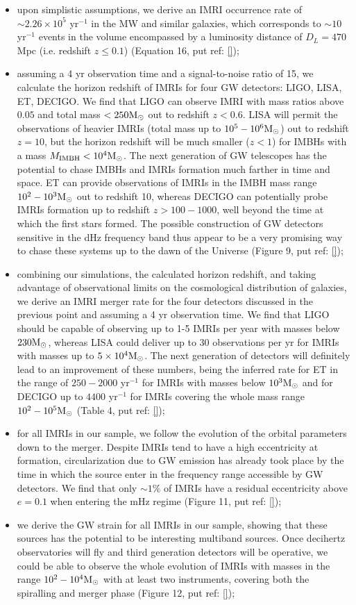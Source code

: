 \documentclass[twocolumn]{aastex62}
\newcommand{\Ms}{{\rm M}_\odot}
\newcommand{\ibh}{{\rm IMBH}}
\begin{document}
\begin{itemize}
\item upon simplistic assumptions, we derive an IMRI occurrence rate of $\sim 2.26\times 10^5$ yr$^{-1}$ in the MW and similar galaxies, which corresponds to $\sim 10$ yr$^{-1}$ events in the volume encompassed by a luminosity distance of $D_L = 470$ Mpc (i.e. redshift $z\leq 0.1$) (Equation 16, put ref: \ref{});
\item assuming a 4 yr observation time and a signal-to-noise ratio of 15, we calculate the horizon redshift of IMRIs for four GW detectors: LIGO, LISA, ET, DECIGO. We find that LIGO can observe IMRI with mass ratios above $0.05$ and total mass $<250\Ms$ out to redshift $z<0.6$. LISA will permit the observations of heavier IMRIs (total mass up to $10^5-10^6\Ms$) out to redshift $z=10$, but the horizon redshift will be much smaller ($z < 1$) for IMBHs with a mass $M_\ibh<10^4\Ms$. The next generation of GW telescopes has the potential to chase IMBHs and IMRIs formation much farther in time and space. ET can provide observations of IMRIs in the IMBH mass range $10^2-10^3\Ms$ out to redshift 10, whereas DECIGO can potentially probe IMRIs formation up to redshift $z > 100-1000$, well beyond the time at which the first stars formed. The possible construction of GW detectors sensitive in the dHz frequency band thus appear to be a very promising way to chase these systems up to the dawn of the Universe (Figure 9, put ref: \ref{});
\item combining our simulations, the calculated horizon redshift, and taking advantage of observational limits on the cosmological distribution of galaxies, we derive an IMRI merger rate for the four detectors discussed in the previous point and assuming a 4 yr observation time. We find that LIGO should be capable of observing up to 1-5 IMRIs per year with masses below $230\Ms$, whereas LISA could deliver up to 30 observations per yr for IMRIs with masses up to $5\times 10^4\Ms$. The next generation of detectors will definitely lead to an improvement of these numbers, being the inferred rate for ET in the range of $250-2000$ yr$^{-1}$ for IMRIs with masses below $10^3\Ms$ and for DECIGO up to $4400$ yr$^{-1}$ for IMRIs covering the whole mass range $10^2-10^5\Ms$ (Table 4, put ref: \ref{});
\item for all IMRIs in our sample, we follow the evolution of the orbital parameters down to the merger. Despite IMRIs tend to have a high eccentricity at formation, circularization due to GW emission has already took place by the time in which the source enter in the frequency range accessible by GW detectors. We find that only $\sim 1\%$ of IMRIs have a residual eccentricity above $e = 0.1$ when entering the mHz regime (Figure 11, put ref: \ref{});
\item we derive the GW strain for all IMRIs in our sample, showing that these sources has the potential to be interesting multiband sources. Once decihertz observatories will fly and third generation detectors will be operative, we could be able to observe the whole evolution of IMRIs with masses in the range $10^2-10^4\Ms$ with at least two instruments, covering both the spiralling and merger phase (Figure 12, put ref: \ref{});  
  
\end{itemize}
\end{document}
